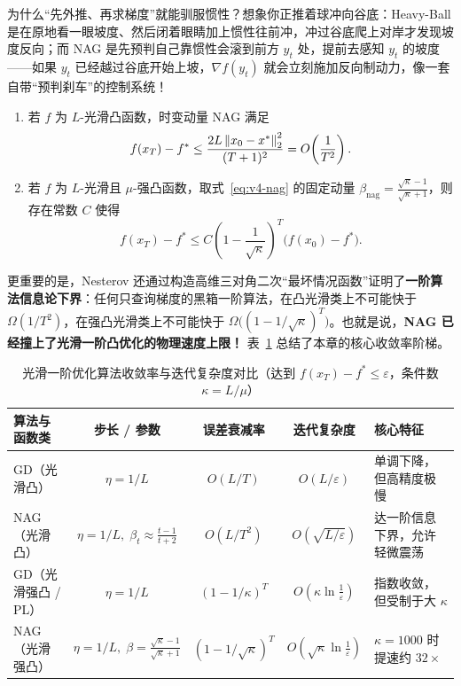 为什么“先外推、再求梯度”就能驯服惯性？想象你正推着球冲向谷底：Heavy-Ball 是在原地看一眼坡度、然后闭着眼睛加上惯性往前冲，冲过谷底爬上对岸才发现坡度反向；而 NAG 是先预判自己靠惯性会滚到前方 $y_t$ 处，提前去感知 $y_t$ 的坡度——如果 $y_t$ 已经越过谷底开始上坡，$\nabla f(y_t)$ 就会立刻施加反向制动力，像一套自带“预判刹车”的控制系统！

\begin{thmBox}
\begin{theorem}\label{thm:v4-nag-rate}
\begin{enumerate}
  \item 若 $f$ 为 $L$-光滑凸函数，时变动量 NAG 满足
  \[
    f(x_T) - f^* \le \frac{2L\left\|x_0 - x^*\right\|_2^2}{(T+1)^2} = O\!\left(\frac{1}{T^2}\right).
  \]
  \item 若 $f$ 为 $L$-光滑且 $\mu$-强凸函数，取式~\eqref{eq:v4-nag} 的固定动量 $\beta_{\text{nag}} = \frac{\sqrt{\kappa}-1}{\sqrt{\kappa}+1}$，则存在常数 $C$ 使得
  \[
    f(x_T) - f^* \le C \left(1 - \frac{1}{\sqrt{\kappa}}\right)^T \big(f(x_0) - f^*\big).
  \]
\end{enumerate}
\end{theorem}
\end{thmBox}

更重要的是，Nesterov 还通过构造高维三对角二次“最坏情况函数”证明了\textbf{一阶算法信息论下界}：任何只查询梯度的黑箱一阶算法，在凸光滑类上不可能快于 $\Omega(1/T^2)$，在强凸光滑类上不可能快于 $\Omega\big((1-1/\sqrt{\kappa})^T\big)$。也就是说，\textbf{NAG 已经撞上了光滑一阶凸优化的物理速度上限！} 表~\ref{tab:v4-ch1-rates} 总结了本章的核心收敛率阶梯。

\begin{table}[htbp]
\centering
\caption{光滑一阶优化算法收敛率与迭代复杂度对比（达到 $f(x_T)-f^* \le \varepsilon$，条件数 $\kappa = L/\mu$）}\label{tab:v4-ch1-rates}
\small
\begin{tabularx}{\linewidth}{@{}lcccX@{}}
\toprule
\textbf{算法与函数类} & \textbf{步长 / 参数} & \textbf{误差衰减率} & \textbf{迭代复杂度} & \textbf{核心特征} \\
\midrule
GD（光滑凸） & $\eta = 1/L$ & $O(L/T)$ & $O(L/\varepsilon)$ & 单调下降，但高精度极慢 \\
NAG（光滑凸） & $\eta = 1/L,\; \beta_t \approx \frac{t-1}{t+2}$ & $O(L/T^2)$ & $O(\sqrt{L/\varepsilon})$ & 达一阶信息下界，允许轻微震荡 \\
GD（光滑强凸 / PL） & $\eta = 1/L$ & $(1-1/\kappa)^T$ & $O(\kappa \ln\frac{1}{\varepsilon})$ & 指数收敛，但受制于大 $\kappa$ \\
NAG（光滑强凸） & $\eta = 1/L,\; \beta = \frac{\sqrt{\kappa}-1}{\sqrt{\kappa}+1}$ & $(1-1/\sqrt{\kappa})^T$ & $O(\sqrt{\kappa}\ln\frac{1}{\varepsilon})$ & $\kappa=1000$ 时提速约 $32\times$ \\
\bottomrule
\end{tabularx}
\end{table}


